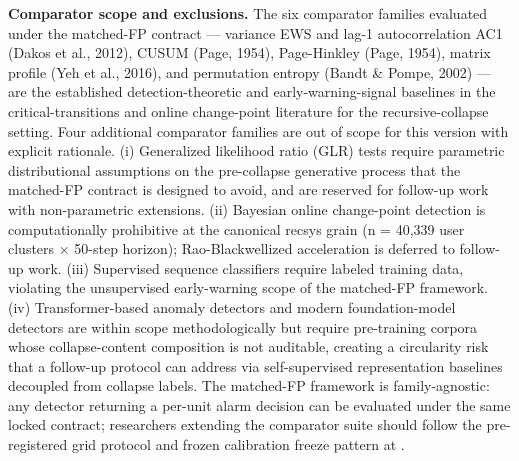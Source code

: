 \documentclass[
  11pt,
]{article}
\begin{document}
\textbf{Comparator scope and exclusions.} The six comparator families
evaluated under the matched-FP contract --- variance EWS and lag-1
autocorrelation AC1 (Dakos et al., 2012), CUSUM (Page, 1954),
Page-Hinkley (Page, 1954), matrix profile (Yeh et al., 2016), and
permutation entropy (Bandt \& Pompe, 2002) --- are the established
detection-theoretic and early-warning-signal baselines in the
critical-transitions and online change-point literature for the
recursive-collapse setting. Four additional comparator families are out
of scope for this version with explicit rationale. (i) Generalized
likelihood ratio (GLR) tests require parametric distributional
assumptions on the pre-collapse generative process that the matched-FP
contract is designed to avoid, and are reserved for follow-up work with
non-parametric extensions. (ii) Bayesian online change-point detection
is computationally prohibitive at the canonical recsys grain (n = 40,339
user clusters × 50-step horizon); Rao-Blackwellized acceleration is
deferred to follow-up work. (iii) Supervised sequence classifiers
require labeled training data, violating the unsupervised early-warning
scope of the matched-FP framework. (iv) Transformer-based anomaly
detectors and modern foundation-model detectors are within scope
methodologically but require pre-training corpora whose collapse-content
composition is not auditable, creating a circularity risk that a
follow-up protocol can address via self-supervised representation
baselines decoupled from collapse labels. The matched-FP framework is
family-agnostic: any detector returning a per-unit alarm decision can be
evaluated under the same locked contract; researchers extending the
comparator suite should follow the pre-registered grid protocol and
frozen calibration freeze pattern at
\texttt{}.
\end{document}
